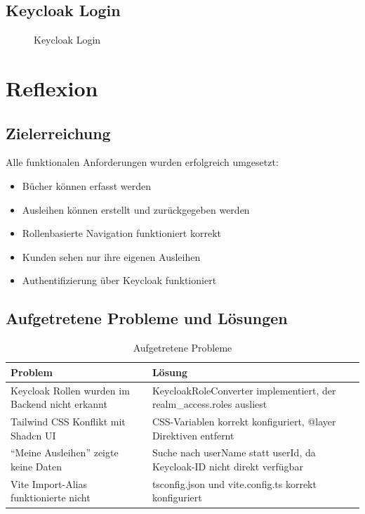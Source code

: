 \documentclass[a4paper,12pt,twoside]{report}
\newcommand{\cmark}{\textcolor{green!60!black}{$\checkmark$}}
\begin{document}
\newpage

\subsection{Keycloak Login}
\begin{figure}[H]
\centering
{}
\caption{Keycloak Login}
\end{figure}

\newpage

\section{Reflexion}

\subsection{Zielerreichung}
Alle funktionalen Anforderungen wurden erfolgreich umgesetzt:
\begin{itemize}
    \item[\cmark] Bücher können erfasst werden
    \item[\cmark] Ausleihen können erstellt und zurückgegeben werden
    \item[\cmark] Rollenbasierte Navigation funktioniert korrekt
    \item[\cmark] Kunden sehen nur ihre eigenen Ausleihen
    \item[\cmark] Authentifizierung über Keycloak funktioniert
\end{itemize}

\subsection{Aufgetretene Probleme und Lösungen}

\begin{table}[H]
\centering
\caption{Aufgetretene Probleme}
\begin{tabularx}{\textwidth}{X X}
\toprule
\textbf{Problem} & \textbf{Lösung} \\
\midrule
Keycloak Rollen wurden im Backend nicht erkannt & KeycloakRoleConverter implementiert, der realm\_access.roles ausliest \\
\midrule
Tailwind CSS Konflikt mit Shadcn UI & CSS-Variablen korrekt konfiguriert, @layer Direktiven entfernt \\
\midrule
``Meine Ausleihen'' zeigte keine Daten & Suche nach userName statt userId, da Keycloak-ID nicht direkt verfügbar \\
\midrule
Vite Import-Alias funktionierte nicht & tsconfig.json und vite.config.ts korrekt konfiguriert \\
\bottomrule
\end{tabularx}
\end{table}
\end{document}
